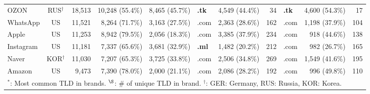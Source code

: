 \begin{table*}[t]
{\begin{tabular}{l c r r r l r r l r r}
OZON & RUS${^\dagger}$ & 18,513 & 10,248 (55.4\%) & 8,465 (45.7\%) & \cellcolor{bubblegum}\textbf{.tk} & 4,549 (44.4\%) & 34 & \cellcolor{bubblegum}\textbf{.tk} & 4,600 (54.3\%) & 17 \\
WhatsApp & US & 11,521 & 8,264 (71.7\%) & 3,163 (27.5\%) & .com & 2,363 (28.6\%) & 162 & .com & 1,198 (37.9\%) & 104 \\
Apple & US & 11,253 & 8,942 (79.5\%) & 2,056 (18.3\%) & .com & 3,385 (37.9\%) & 234 & .com & 918 (44.6\%) & 138 \\
Instagram & US & 11,181 & 7,337 (65.6\%) & 3,681 (32.9\%) & \cellcolor{bubblegum}\textbf{.ml} & 1,482 (20.2\%) & 212 & .com & 982 (26.7\%) & 165 \\
Naver & KOR${^\dagger}$ & 11,030 & 7,207 (65.3\%) & 3,725 (33.8\%) & .com & 2,506 (34.8\%) & 269 & .com & 1,549 (41.6\%) & 195 \\
Amazon & US & 9,473 & 7,390 (78.0\%) & 2,000 (21.1\%) & .com & 2,086 (28.2\%) & 192 & .com & 996 (49.8\%) & 110 \\
\midrule
\multicolumn{11}{l}{${^\ast}$: Most common TLD in brands. ${^\S}$: \# of unique TLD in brand. ${^\dagger}$: GER: Germany, RUS: Russia, KOR: Korea.}
\end{tabular}
}
\end{table*}


